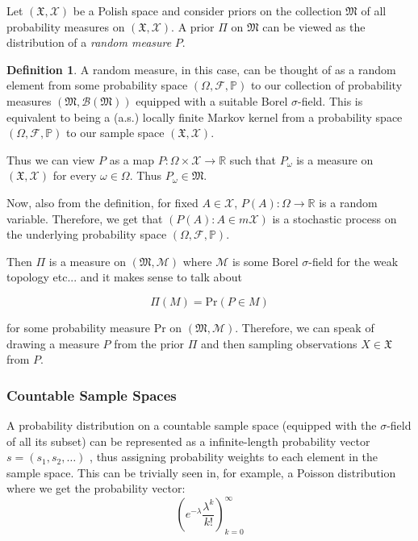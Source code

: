 \documentclass[a4paper,11pt]{article}
\theoremstyle{theorem}
\theoremstyle{definition}
\newtheorem{defn}{Definition}[section]
\begin{document}
Let $(\mathfrak{X}, \mathcal{X})$ be a Polish space and consider priors on the collection $\mathfrak{M}$ of all probability measures on $(\mathfrak{X}, \mathcal{X})$. A prior $\Pi$ on $\mathfrak{M}$ can be viewed as the distribution of a \textit{random measure} $P$.

\begin{defn}
A random measure, in this case, can be thought of as a random element from some probability space $(\Omega, \mathcal{F}, \mathbb{P})$ to our collection of probability measures $(\mathfrak{M}, \mathcal{B}(\mathfrak{M}))$ equipped with a suitable Borel $\sigma$-field. This is equivalent to being a (a.s.) locally finite Markov kernel from a probability space $(\Omega, \mathcal{F}, \mathbb{P})$ to our sample space $(\mathfrak{X}, \mathcal{X})$. 
\end{defn} 

Thus we can view $P$ as a map $P: \Omega \times \mathcal{X} \to \mathbb{R}$ such that $P_{\omega}$ is a measure on $(\mathfrak{X}, \mathcal{X})$ for every $\omega \in \Omega$. Thus $P_{\omega} \in \mathfrak{M}$.

Now, also from the definition, for fixed $A \in \mathcal{X}$, $P(A) : \Omega \to \mathbb{R}$ is a random variable. Therefore, we get that $(P(A) : A \in m\mathcal{X})$ is a stochastic process on the underlying probability space $(\Omega, \mathcal{F}, \mathbb{P})$.

Then $\Pi$ is a measure on $(\mathfrak{M}, \mathcal{M})$ where $\mathcal{M}$ is some Borel $\sigma$-field for the weak topology etc... and it makes sense to talk about

\[
\Pi(M) = \text{Pr}(P \in M) 
\]

for some probability measure Pr on $(\mathfrak{M}, \mathcal{M})$. Therefore, we can speak of drawing a measure $P$ from the prior $\Pi$ and then sampling observations $X \in \mathfrak{X}$ from $P$.

\subsubsection{Countable Sample Spaces}

A probability distribution on a countable sample space (equipped with the $\sigma$-field of all its subset) can be represented as a infinite-length probability vector $s = (s_1, s_2, \dotsc)$ , thus assigning probability weights to each element in the sample space. This can be trivially seen in, for example, a Poisson distribution where we get the probability vector:
\[
\left(e^{-\lambda}\frac{\lambda^{k}}{k!}\right)_{k=0}^{\infty}
\]
\end{document}
